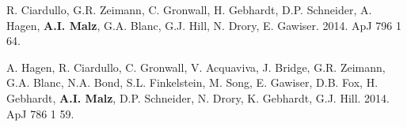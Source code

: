 \begin{list}{\pubnumber{\therefpubnum}}{\malzlist}
\item R. Ciardullo, G.R. Zeimann, C. Gronwall, H. Gebhardt, D.P. Schneider, A. Hagen, {\bf A.I. Malz}, G.A. Blanc, G.J. Hill, N. Drory, E. Gawiser. 2014. ApJ 796 1 64. 

\item A. Hagen, R. Ciardullo, C. Gronwall, V. Acquaviva, J. Bridge, G.R. Zeimann, G.A. Blanc, N.A. Bond, S.L. Finkelstein, M. Song, E. Gawiser, D.B. Fox, H. Gebhardt, {\bf A.I. Malz}, D.P. Schneider, N. Drory, K. Gebhardt, G.J. Hill. 2014. ApJ 786 1 59. 
\end{list}

